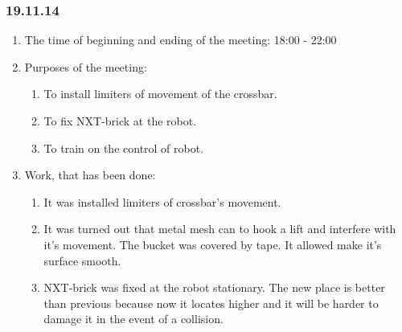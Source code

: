 \subsubsection{19.11.14}

\begin{enumerate}
	\item The time of beginning and ending of the meeting:
	18:00 - 22:00
	\item Purposes of the meeting:
	\begin{enumerate}
	  \item To install limiters of movement of the crossbar.
	  
	  \item To fix NXT-brick at the robot.
	  
	  \item To train on the control of robot.
	  
    \end{enumerate}
	\item Work, that has been done:
	\begin{enumerate}
	  \item It was installed limiters of crossbar's movement.
	  

      \item It was turned out that metal mesh can to hook a lift and interfere with it's movement. The bucket was covered by tape. It allowed make it's surface smooth.
      
      \item NXT-brick was fixed at the robot stationary. The new place is better than previous because now it locates higher and it will be harder to damage it in the event of a collision.
      

\end{enumerate}
\end{enumerate}
